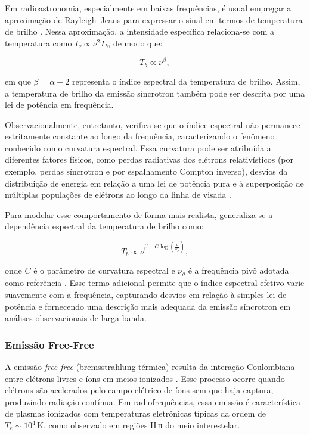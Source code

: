 Em radioastronomia, especialmente em baixas frequências, é usual empregar a aproximação de Rayleigh–Jeans para expressar o sinal em termos de temperatura de brilho \cite{EEL2018}. Nessa aproximação, a intensidade específica relaciona-se com a temperatura como \(I_\nu \propto \nu^2 T_b\), de modo que:

\begin{equation}
    T_b \propto \nu^\beta,
\end{equation}

em que \(\beta = \alpha - 2\) representa o índice espectral da temperatura de brilho. Assim, a temperatura de brilho da emissão síncrotron também pode ser descrita por uma lei de potência em frequência.

Observacionalmente, entretanto, verifica-se que o índice espectral não permanece estritamente constante ao longo da frequência, caracterizando o fenômeno conhecido como curvatura espectral. Essa curvatura pode ser atribuída a diferentes fatores físicos, como perdas radiativas dos elétrons relativísticos (por exemplo, perdas síncrotron e por espalhamento Compton inverso), desvios da distribuição de energia em relação a uma lei de potência pura e à superposição de múltiplas populações de elétrons ao longo da linha de visada \cite{EEL2018}.

Para modelar esse comportamento de forma mais realista, generaliza-se a dependência espectral da temperatura de brilho como:

\begin{equation}
    T_b \propto \nu^{\beta + C \log\left(\frac{\nu}{\nu_\rho}\right)},
\end{equation}

onde \(C\) é o parâmetro de curvatura espectral e \(\nu_\rho\) é a frequência pivô adotada como referência \cite{EEL2018}. Esse termo adicional permite que o índice espectral efetivo varie suavemente com a frequência, capturando desvios em relação à simples lei de potência e fornecendo uma descrição mais adequada da emissão síncrotron em análises observacionais de larga banda.

\subsubsection{Emissão Free-Free}

A emissão \textit{free-free} (bremsstrahlung térmica) resulta da interação Coulombiana entre elétrons livres e íons em meios ionizados \cite{burke2019introduction, ahmed2015_phys_eng_detection}. Esse processo ocorre quando elétrons são acelerados pelo campo elétrico de íons sem que haja captura, produzindo radiação contínua. Em radiofrequências, essa emissão é característica de plasmas ionizados com temperaturas eletrônicas típicas da ordem de \(T_e \sim 10^4\,\mathrm{K}\), como observado em regiões H\,\textsc{ii} do meio interestelar.

